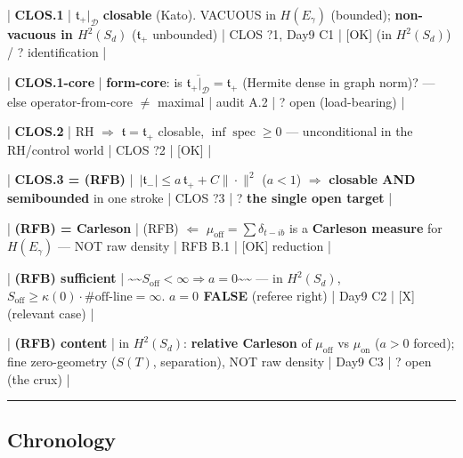 \documentclass[10pt]{article}
\begin{document}
| \textbf{CLOS.1} | $\mathfrak t_+|_{\mathcal D}$ \textbf{closable} (Kato). VACUOUS in $H(E_\gamma)$ (bounded); \textbf{non-vacuous in $H^2(S_d)$} ($\mathfrak t_+$ unbounded) | CLOS ?1, Day9 C1 | [OK] (in $H^2(S_d)$) / ? identification |\par
| \textbf{CLOS.1-core} | \textbf{form-core}: is $\overline{\mathfrak t_+|_{\mathcal D}}=\mathfrak t_+$ (Hermite dense in graph norm)? --- else operator-from-core $\neq$ maximal | audit A.2 | ? open (load-bearing) |\par
| \textbf{CLOS.2} | RH $\Rightarrow$ $\mathfrak t=\mathfrak t_+$ closable, $\inf\operatorname{spec}\ge0$ --- unconditional in the RH/control world | CLOS ?2 | [OK] |\par
| \textbf{CLOS.3 = (RFB)} | $\,|\mathfrak t_-|\le a\,\mathfrak t_++C\|\cdot\|^2$ ($a<1$) $\Rightarrow$ \textbf{closable AND semibounded} in one stroke | CLOS ?3 | ? \textbf{the single open target} |\par
| \textbf{(RFB) = Carleson} | (RFB) $\Leftarrow$ $\mu_{\mathrm{off}}=\sum\delta_{t-ib}$ is a \textbf{Carleson measure} for $H(E_\gamma)$ --- NOT raw density | RFB B.1 | [OK] reduction |\par
| \textbf{(RFB) sufficient} | \textasciitilde{}\textasciitilde{}$S_{\mathrm{off}}<\infty\Rightarrow a=0$\textasciitilde{}\textasciitilde{} --- in $H^2(S_d)$, $S_{\mathrm{off}}\ge\kappa(0)\cdot\#\text{off-line}=\infty$. \textbf{$a=0$ FALSE} (referee right) | Day9 C2 | [X] (relevant case) |\par
| \textbf{(RFB) content} | in $H^2(S_d)$: \textbf{relative Carleson} of $\mu_{\mathrm{off}}$ vs $\mu_{\mathrm{on}}$ ($a>0$ forced); fine zero-geometry ($S(T)$, separation), NOT raw density | Day9 C3 | ? open (the crux) |\par

\medskip\hrule\medskip

\subsection*{Chronology}
\end{document}
